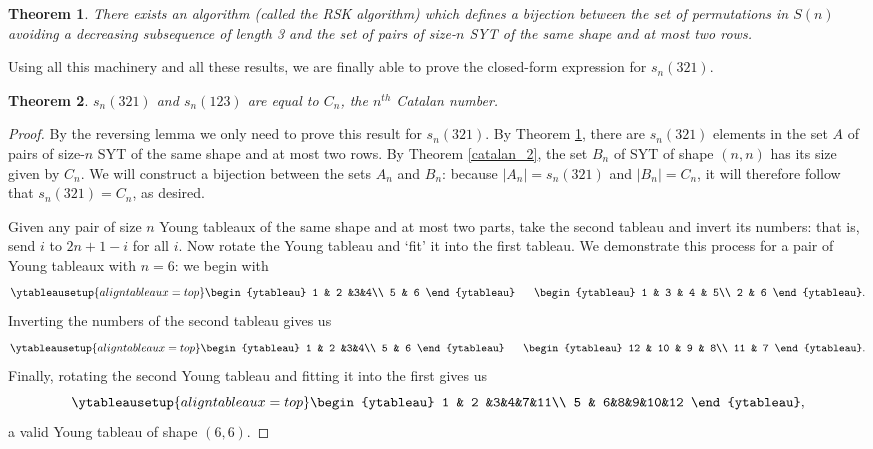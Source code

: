 \documentclass[11pt,letterpaper,twoside,english]{article}
\theoremstyle{theorem}
\newtheorem{theorem}{Theorem}[section]
\theoremstyle{remark}
\begin{document}
\begin{theorem}
\label{rsk}
There exists an algorithm (called the \emph{RSK algorithm}) which defines a bijection between the set of permutations in $S(n)$ avoiding a decreasing subsequence of length 3 and the set of pairs of size-$n$ SYT of the same shape and at most two rows. 
\end{theorem}
Using all this machinery and all these results, we are finally able to prove the closed-form expression for $s_n(321)$.
\begin{theorem}
$s_n(321)$ and $s_n(123)$ are equal to $C_n$, the $n^{th}$ Catalan number.
\end{theorem}
\begin{proof}
By the reversing lemma we only need to prove this result for $s_n(321)$. By Theorem \ref{rsk}, there are $s_n(321)$ elements in the set $A$ of pairs of size-$n$ SYT of the same shape and at most two rows. By Theorem \ref{catalan_2}, the set $B_n$ of SYT of shape $(n, n)$ has its size given by $C_n$. We will construct a bijection between the sets $A_n$ and $B_n$: because $|A_n|=s_n(321)$ and $|B_n|=C_n$, it will therefore follow that $s_n(321)=C_n$, as desired.

Given any pair of size $n$ Young tableaux of the same shape and at most two parts, take the second tableau and invert its numbers: that is, send $i$ to $2n+1-i$ for all $i$. Now rotate the Young tableau and `fit' it into the first tableau. We demonstrate this process for a pair of Young tableaux with $n=6$: we begin with
\[\ytableausetup{aligntableaux=top}
\begin{ytableau}
1 & 2 &3&4\\
5 & 6
\end{ytableau} \ \ \ \ \ 
\hfill
\begin{ytableau}
1 & 3 & 4 & 5\\
2 & 6
\end{ytableau}.\]
Inverting the numbers of the second tableau gives us
\[\ytableausetup{aligntableaux=top}
\begin{ytableau}
1 & 2 &3&4\\
5 & 6
\end{ytableau} \ \ \ \ \ 
\hfill
\begin{ytableau}
12 & 10 & 9 & 8\\
11 & 7
\end{ytableau}.\]
Finally, rotating the second Young tableau and fitting it into the first gives us
\[\ytableausetup{aligntableaux=top}
\begin{ytableau}
1 & 2 &3&4&7&11\\
5 & 6&8&9&10&12
\end{ytableau},\]
a valid Young tableau of shape $(6, 6)$. 


\end{proof}
\end{document}
